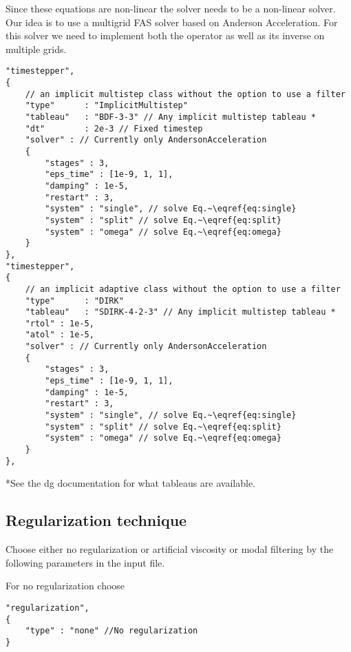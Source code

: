 Since these equations are non-linear the solver needs to be a non-linear solver. Our idea is to use a multigrid FAS solver based on Anderson Acceleration. For this solver we need to implement both the operator as well as its inverse on multiple grids.
\begin{verbatim}
"timestepper",
{
    // an implicit multistep class without the option to use a filter
    "type"      : "ImplicitMultistep"
    "tableau"   : "BDF-3-3" // Any implicit multistep tableau *
    "dt"        : 2e-3 // Fixed timestep
    "solver" : // Currently only AndersonAcceleration
    {
        "stages" : 3,
        "eps_time" : [1e-9, 1, 1],
        "damping" : 1e-5,
        "restart" : 3,
        "system" : "single", // solve Eq.~\eqref{eq:single}
        "system" : "split" // solve Eq.~\eqref{eq:split}
        "system" : "omega" // solve Eq.~\eqref{eq:omega}
    }
},
"timestepper",
{
    // an implicit adaptive class without the option to use a filter
    "type"      : "DIRK"
    "tableau"   : "SDIRK-4-2-3" // Any implicit multistep tableau *
    "rtol" : 1e-5,
    "atol" : 1e-5,
    "solver" : // Currently only AndersonAcceleration
    {
        "stages" : 3,
        "eps_time" : [1e-9, 1, 1],
        "damping" : 1e-5,
        "restart" : 3,
        "system" : "single", // solve Eq.~\eqref{eq:single}
        "system" : "split" // solve Eq.~\eqref{eq:split}
        "system" : "omega" // solve Eq.~\eqref{eq:omega}
    }
},
\end{verbatim}
*See the dg documentation for what tableaus are available.
\subsection{Regularization technique}
Choose either no regularization or artificial viscosity or modal filtering by the following
parameters in the input file.

For no regularization choose
\begin{verbatim}
"regularization",
{
    "type" : "none" //No regularization
}
\end{verbatim}

